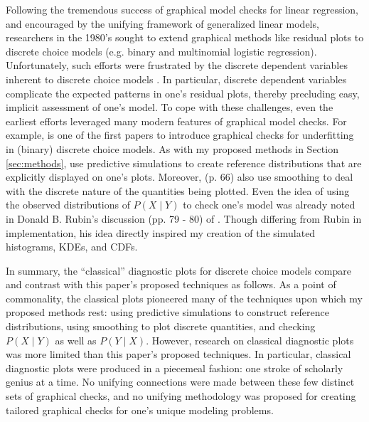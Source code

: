 \documentclass[preprint]{elsarticle}
\begin{document}
Following the tremendous success of graphical model checks for linear regression, and encouraged by the unifying framework of generalized linear models, researchers in the 1980's sought to extend graphical methods like residual plots to discrete choice models (e.g. binary and multinomial logistic regression). Unfortunately, such efforts were frustrated by the discrete dependent variables inherent to discrete choice models \citep[pp. 747-748]{albert_bayesian_1995}. In particular, discrete dependent variables complicate the expected patterns in one's residual plots, thereby precluding easy, implicit assessment of one's model. To cope with these challenges, even the earliest efforts leveraged many modern features of graphical model checks. For example, \citet{landwehr_graphical_1984} is one of the first papers to introduce graphical checks for underfitting in (binary) discrete choice models. As with my proposed methods in Section \ref{sec:methods}, \citet[p. 64]{landwehr_graphical_1984} use predictive simulations to create reference distributions that are explicitly displayed on one's plots. Moreover, \citeauthor{landwehr_graphical_1984} (p. 66) also use smoothing to deal with the discrete nature of the quantities being plotted. Even the idea of using the observed distributions of $P \left( X \mid Y \right)$ to check one's model was already noted in Donald B. Rubin's discussion (pp. 79 - 80) of \citet{landwehr_graphical_1984}. Though differing from Rubin in implementation, his idea directly inspired my creation of the simulated histograms, KDEs, and CDFs.

In summary, the ``classical'' diagnostic plots for discrete choice models compare and contrast with this paper's proposed techniques as follows. As a point of commonality, the classical plots pioneered many of the techniques upon which my proposed methods rest: using predictive simulations to construct reference distributions, using smoothing to plot discrete quantities, and checking $P \left( X \mid Y \right)$ as well as $P \left( Y \mid X \right)$. However, research on classical diagnostic plots was more limited than this paper's proposed techniques. In particular, classical diagnostic plots were produced in a piecemeal fashion: one stroke of scholarly genius at a time. No unifying connections were made between these few distinct sets of graphical checks, and no unifying methodology was proposed for creating tailored graphical checks for one's unique modeling problems.
\end{document}
